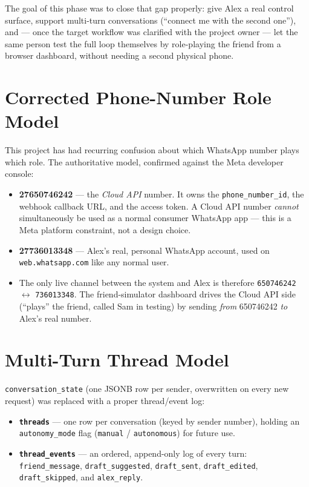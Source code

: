 \documentclass[12pt, a4paper]{report}
\begin{document}
The goal of this phase was to close that gap properly: give Alex a real control surface, support multi-turn conversations (``connect me with the second one''), and --- once the target workflow was clarified with the project owner --- let the same person test the full loop themselves by role-playing the friend from a browser dashboard, without needing a second physical phone.

\section{Corrected Phone-Number Role Model}

This project has had recurring confusion about which WhatsApp number plays which role. The authoritative model, confirmed against the Meta developer console:

\begin{itemize}[itemsep=3pt]
    \item \textbf{27650746242} --- the \emph{Cloud API} number. It owns the \texttt{phone\_number\_id}, the webhook callback URL, and the access token. A Cloud API number \emph{cannot} simultaneously be used as a normal consumer WhatsApp app --- this is a Meta platform constraint, not a design choice.
    \item \textbf{27736013348} --- Alex's real, personal WhatsApp account, used on \texttt{web.whatsapp.com} like any normal user.
    \item The only live channel between the system and Alex is therefore \texttt{650746242} $\leftrightarrow$ \texttt{736013348}. The friend-simulator dashboard drives the Cloud API side (``plays'' the friend, called Sam in testing) by sending \emph{from} 650746242 \emph{to} Alex's real number.
\end{itemize}

\section{Multi-Turn Thread Model}

\texttt{conversation\_state} (one JSONB row per sender, overwritten on every new request) was replaced with a proper thread/event log:

\begin{itemize}[itemsep=3pt]
    \item \textbf{\texttt{threads}} --- one row per conversation (keyed by sender number), holding an \texttt{autonomy\_mode} flag (\texttt{manual} / \texttt{autonomous}) for future use.
    \item \textbf{\texttt{thread\_events}} --- an ordered, append-only log of every turn: \texttt{friend\_message}, \texttt{draft\_suggested}, \texttt{draft\_sent}, \texttt{draft\_edited}, \texttt{draft\_skipped}, and \texttt{alex\_reply}.
\end{itemize}
\end{document}
